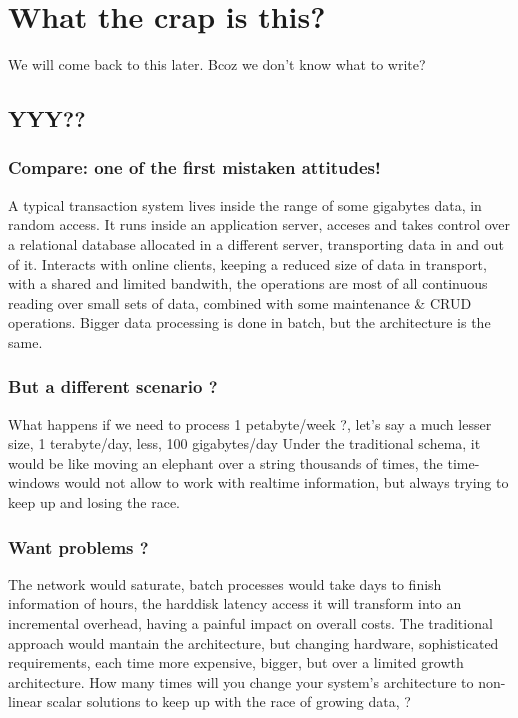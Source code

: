 \chapter{What the crap is this?}
We will come back to this later. Bcoz we don't know what to write? 
\section{YYY??}
\subsection{Compare: one of the first mistaken attitudes!}
A typical transaction system lives inside the range of some gigabytes data, in random access. It runs inside an application server, acceses and takes control over a relational database allocated in a different server, transporting data in and out of it.
Interacts with online clients, keeping a reduced size of data in transport, with a shared and limited bandwith, the operations are most of all continuous reading over small sets of data, combined with some maintenance \& CRUD operations.
Bigger data processing is done in batch, but the architecture is the same.

\subsection{But a different scenario ?}
What happens if we need to process 1 petabyte/week ?, let's say a much lesser size, 1 terabyte/day, less, 100 gigabytes/day
Under the traditional schema, it would be like moving an elephant over a string thousands of times, the time-windows would not allow to work with realtime information, but always trying to keep up and losing the race.

\subsection{Want problems ?}
The network would saturate, batch processes would take days to finish information of hours, the harddisk latency access it will transform into an incremental overhead, having a painful impact on overall costs.
The traditional approach would mantain the architecture, but changing hardware, sophisticated requirements, each time more expensive, bigger, but over a limited growth architecture. How many times will you change your system's architecture to non-linear scalar solutions to keep up with the race of growing data, ?


